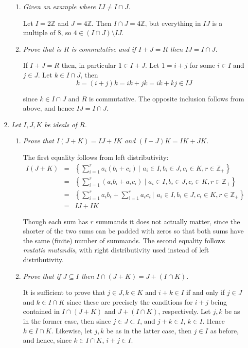 \documentclass[letterpaper, 11pt]{article}
\newcommand{\Z}{\mathbb{Z}}
\begin{document}
\begin{enumerate}
\begin{enumerate}
\item \emph{Given an example where $IJ \neq I \cap J$.}

Let $I = 2\Z$ and $J=4\Z$.  Then $I \cap J = 4\Z$, but everything in $IJ$ is a multiple of $8$, so $4 \in (I \cap J) \setminus IJ$.

\item \emph{Prove that is $R$ is commutative and if $I+J = R$ then $IJ = I \cap J$.}

If $I+J = R$ then, in particular $1 \in I+J$.  Let $1 = i+j$ for some $i \in I$ and $j \in J$.  Let $k \in I \cap J$, then
\[
k = (i+j)k = ik + jk = ik + kj \in IJ
\]

since $k \in I \cap J$ and $R$ is commutative.  The opposite inclusion follows from above, and hence $IJ = I \cap J$.

\end{enumerate}

\item \emph{Let $I,J,K$ be ideals of $R$.}
\begin{enumerate}
\item \emph{Prove that $I(J+K) = IJ + IK$ and $(I+J)K = IK + JK$.}

The first equality follows from left distributivity:
\begin{eqnarray*}
I(J+K) &=& \left\{ \sum_{i=1}^r a_i(b_i+c_i) \mid a_i \in I, b_i \in J, c_i \in K, r \in \Z_+ \right\} \\
&=& \left\{ \sum_{i=1}^r (a_ib_i+a_ic_i) \mid a_i \in I, b_i \in J, c_i \in K, r \in \Z_+ \right\} \\
&=& \left\{ \sum_{i=1}^r a_ib_i + \sum_{i=1}^r a_ic_i \mid a_i \in I, b_i \in J, c_i \in K, r \in \Z_+ \right\} \\\
&=& IJ + IK
\end{eqnarray*}

Though each sum has $r$ summands it does not actually matter, since the shorter of the two sums can be padded with zeros so that both sums have the same (finite) number of summands.  The second equality follows \emph{mutatis mutandis}, with right distributivity used instead of left distributivity.

\item \emph{Prove that if $J \subseteq I$ then $I \cap(J+K) = J+(I \cap K)$.}

It is sufficient to prove that $j \in J, k \in K$ and $i+k \in I$ if and only if $j \in J$ and $k \in I \cap K$ since these are precisely the conditions for $i+j$ being contained in $I \cap(J+K)$ and $J+(I \cap K)$, respectively.  Let $j,k$ be as in the former case, then since $j \in J \subset I$, and $j+k \in I$, $k \in I$.  Hence $k \in I \cap K$.  Likewise, let $j,k$ be as in the latter case, then $j \in I$ as before, and hence, since $k \in I \cap K$, $i+j \in I$.
\end{enumerate}

\end{enumerate}
\end{document}

